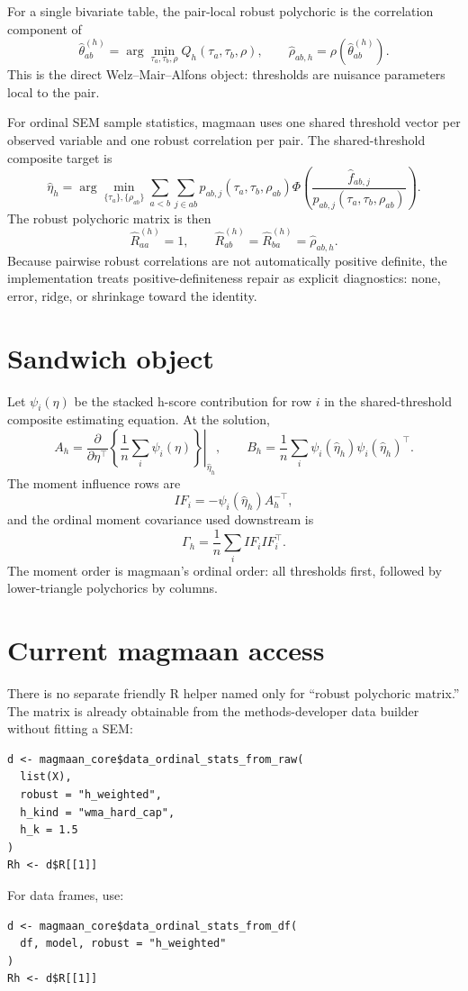\documentclass[11pt]{article}
\newcommand{\Rmat}{\widehat R^{(h)}}
\newcommand{\thetahat}{\widehat\theta^{(h)}}
\begin{document}
For a single bivariate table, the pair-local robust polychoric is the
correlation component of
\[
  \thetahat_{ab}
  =
  \arg\min_{\tau_a,\tau_b,\rho}
  Q_h(\tau_a,\tau_b,\rho),
  \qquad
  \widehat\rho_{ab,h} =
  \rho(\thetahat_{ab}).
\]
This is the direct Welz--Mair--Alfons object: thresholds are nuisance
parameters local to the pair.

For ordinal SEM sample statistics, magmaan uses one shared threshold vector per
observed variable and one robust correlation per pair. The shared-threshold
composite target is
\[
  \widehat\eta_h =
  \arg\min_{\{\tau_a\},\{\rho_{ab}\}}
  \sum_{a<b}\sum_{j\in ab}
  p_{ab,j}(\tau_a,\tau_b,\rho_{ab})
  \Phi\!\left(
    \frac{\widehat f_{ab,j}}
         {p_{ab,j}(\tau_a,\tau_b,\rho_{ab})}
  \right).
\]
The robust polychoric matrix is then
\[
  \Rmat_{aa}=1,
  \qquad
  \Rmat_{ab}=\Rmat_{ba}=\widehat\rho_{ab,h}.
\]
Because pairwise robust correlations are not automatically positive definite,
the implementation treats positive-definiteness repair as explicit diagnostics:
none, error, ridge, or shrinkage toward the identity.

\section*{Sandwich object}

Let $\psi_i(\eta)$ be the stacked h-score contribution for row $i$ in the
shared-threshold composite estimating equation. At the solution,
\[
  A_h =
  \left.
  \frac{\partial}{\partial \eta^\top}
  \left\{
    \frac{1}{n}\sum_i \psi_i(\eta)
  \right\}
  \right|_{\widehat\eta_h},
  \qquad
  B_h =
  \frac{1}{n}\sum_i
  \psi_i(\widehat\eta_h)\psi_i(\widehat\eta_h)^\top .
\]
The moment influence rows are
\[
  IF_i = -\psi_i(\widehat\eta_h) A_h^{-\top},
\]
and the ordinal moment covariance used downstream is
\[
  \Gamma_h = \frac{1}{n}\sum_i IF_i IF_i^\top .
\]
The moment order is magmaan's ordinal order: all thresholds first, followed by
lower-triangle polychorics by columns.

\section*{Current magmaan access}

There is no separate friendly R helper named only for ``robust polychoric
matrix.'' The matrix is already obtainable from the methods-developer data
builder without fitting a SEM:
\begin{verbatim}
d <- magmaan_core$data_ordinal_stats_from_raw(
  list(X),
  robust = "h_weighted",
  h_kind = "wma_hard_cap",
  h_k = 1.5
)
Rh <- d$R[[1]]
\end{verbatim}
For data frames, use:
\begin{verbatim}
d <- magmaan_core$data_ordinal_stats_from_df(
  df, model, robust = "h_weighted"
)
Rh <- d$R[[1]]
\end{verbatim}
\end{document}

